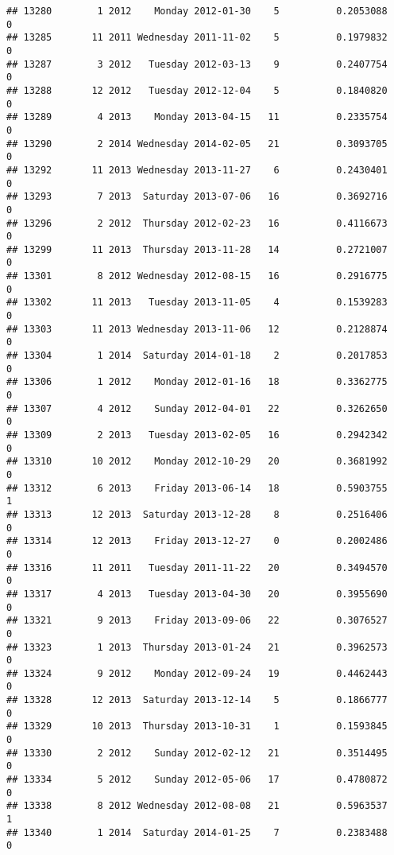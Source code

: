 \documentclass[
]{article}
\begin{document}
\begin{verbatim}
## 13280        1 2012    Monday 2012-01-30    5          0.2053088             0
## 13285       11 2011 Wednesday 2011-11-02    5          0.1979832             0
## 13287        3 2012   Tuesday 2012-03-13    9          0.2407754             0
## 13288       12 2012   Tuesday 2012-12-04    5          0.1840820             0
## 13289        4 2013    Monday 2013-04-15   11          0.2335754             0
## 13290        2 2014 Wednesday 2014-02-05   21          0.3093705             0
## 13292       11 2013 Wednesday 2013-11-27    6          0.2430401             0
## 13293        7 2013  Saturday 2013-07-06   16          0.3692716             0
## 13296        2 2012  Thursday 2012-02-23   16          0.4116673             0
## 13299       11 2013  Thursday 2013-11-28   14          0.2721007             0
## 13301        8 2012 Wednesday 2012-08-15   16          0.2916775             0
## 13302       11 2013   Tuesday 2013-11-05    4          0.1539283             0
## 13303       11 2013 Wednesday 2013-11-06   12          0.2128874             0
## 13304        1 2014  Saturday 2014-01-18    2          0.2017853             0
## 13306        1 2012    Monday 2012-01-16   18          0.3362775             0
## 13307        4 2012    Sunday 2012-04-01   22          0.3262650             0
## 13309        2 2013   Tuesday 2013-02-05   16          0.2942342             0
## 13310       10 2012    Monday 2012-10-29   20          0.3681992             0
## 13312        6 2013    Friday 2013-06-14   18          0.5903755             1
## 13313       12 2013  Saturday 2013-12-28    8          0.2516406             0
## 13314       12 2013    Friday 2013-12-27    0          0.2002486             0
## 13316       11 2011   Tuesday 2011-11-22   20          0.3494570             0
## 13317        4 2013   Tuesday 2013-04-30   20          0.3955690             0
## 13321        9 2013    Friday 2013-09-06   22          0.3076527             0
## 13323        1 2013  Thursday 2013-01-24   21          0.3962573             0
## 13324        9 2012    Monday 2012-09-24   19          0.4462443             0
## 13328       12 2013  Saturday 2013-12-14    5          0.1866777             0
## 13329       10 2013  Thursday 2013-10-31    1          0.1593845             0
## 13330        2 2012    Sunday 2012-02-12   21          0.3514495             0
## 13334        5 2012    Sunday 2012-05-06   17          0.4780872             0
## 13338        8 2012 Wednesday 2012-08-08   21          0.5963537             1
## 13340        1 2014  Saturday 2014-01-25    7          0.2383488             0

\end{verbatim}
\end{document}

